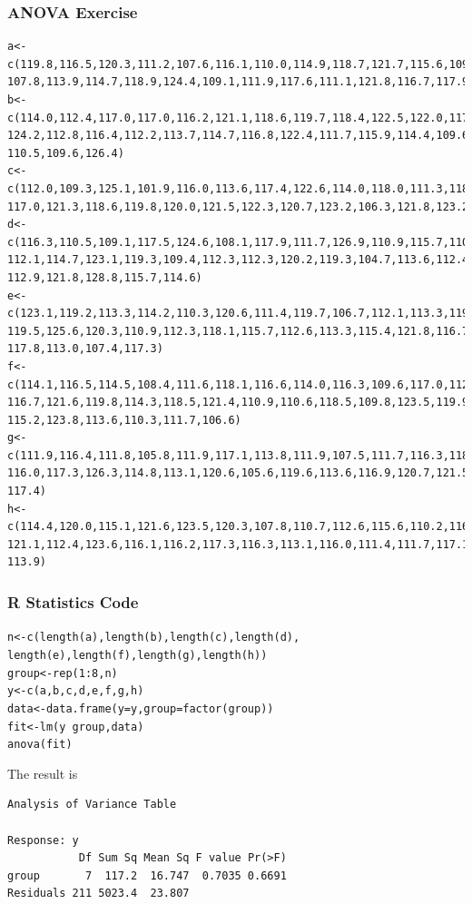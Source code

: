 \documentclass[xcolor=dvipsnames]{beamer}
\begin{document}
\begin{frame}[fragile]
  \frametitle{ANOVA Exercise}
  \begin{scriptsize}
\begin{verbatim}
a<-c(119.8,116.5,120.3,111.2,107.6,116.1,110.0,114.9,118.7,121.7,115.6,109.4,
107.8,113.9,114.7,118.9,124.4,109.1,111.9,117.6,111.1,121.8,116.7,117.9,117.9)
b<-c(114.0,112.4,117.0,117.0,116.2,121.1,118.6,119.7,118.4,122.5,122.0,117.8,
124.2,112.8,116.4,112.2,113.7,114.7,116.8,122.4,111.7,115.9,114.4,109.6,123.2,
110.5,109.6,126.4)
c<-c(112.0,109.3,125.1,101.9,116.0,113.6,117.4,122.6,114.0,118.0,111.3,118.4,
117.0,121.3,118.6,119.8,120.0,121.5,122.3,120.7,123.2,106.3,121.8,123.2)
d<-c(116.3,110.5,109.1,117.5,124.6,108.1,117.9,111.7,126.9,110.9,115.7,110.8,
112.1,114.7,123.1,119.3,109.4,112.3,112.3,120.2,119.3,104.7,113.6,112.4,115.2,
112.9,121.8,128.8,115.7,114.6)
e<-c(123.1,119.2,113.3,114.2,110.3,120.6,111.4,119.7,106.7,112.1,113.3,119.3,
119.5,125.6,120.3,110.9,112.3,118.1,115.7,112.6,113.3,115.4,121.8,116.7,109.1,
117.8,113.0,107.4,117.3)
f<-c(114.1,116.5,114.5,108.4,111.6,118.1,116.6,114.0,116.3,109.6,117.0,112.0,
116.7,121.6,119.8,114.3,118.5,121.4,110.9,110.6,118.5,109.8,123.5,119.9,114.1,
115.2,123.8,113.6,110.3,111.7,106.6)
g<-c(111.9,116.4,111.8,105.8,111.9,117.1,113.8,111.9,107.5,111.7,116.3,118.4,
116.0,117.3,126.3,114.8,113.1,120.6,105.6,119.6,113.6,116.9,120.7,121.5,117.1,
117.4)
h<-c(114.4,120.0,115.1,121.6,123.5,120.3,107.8,110.7,112.6,115.6,110.2,116.3,
121.1,112.4,123.6,116.1,116.2,117.3,116.3,113.1,116.0,111.4,111.7,117.1,116.2,
113.9)
\end{verbatim}
  \end{scriptsize}
\end{frame}

\begin{frame}[fragile]
  \frametitle{R Statistics Code}
\begin{scriptsize}
\begin{alltt}
n<-c(length(a),length(b),length(c),length(d),\newline
length(e),length(f),length(g),length(h))\newline
group<-rep(1:8,n)\newline
y<-c(a,b,c,d,e,f,g,h)\newline
data<-data.frame(y=y,group=factor(group))\newline
fit<-lm(y~group,data)\newline
anova(fit)\newline
\end{alltt}
\end{scriptsize}
The result is
\begin{verbatim}
Analysis of Variance Table

Response: y
           Df Sum Sq Mean Sq F value Pr(>F)
group       7  117.2  16.747  0.7035 0.6691
Residuals 211 5023.4  23.807 
\end{verbatim}
\end{frame}
\end{document}
